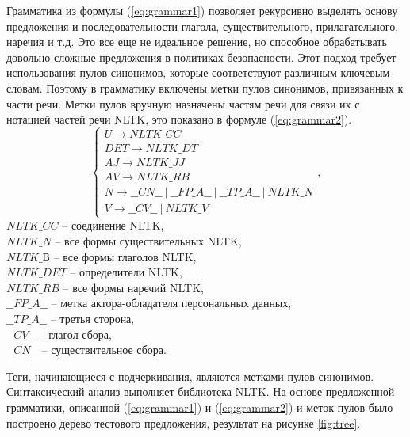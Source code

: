 \documentclass[../main]{subfiles}
\begin{document}
Грамматика из формулы (\ref{eq:grammar1}) позволяет рекурсивно выделять основу предложения и последовательности глагола, существительного, прилагательного, наречия и т.д. Это все еще не идеальное решение, но способное обрабатывать довольно сложные предложения в политиках безопасности. Этот подход требует использования пулов синонимов, которые соответствуют различным ключевым словам. Поэтому в грамматику включены метки пулов синонимов, привязанных к части речи. Метки пулов вручную назначены частям речи для связи их с нотацией частей речи NLTK, это показано в формуле (\ref{eq:grammar2}).
\begin{equation}
    \label{eq:grammar2}
    \left\{ 
        \begin{array}{l}
            U \rightarrow NLTK\_CC \\
            DET \rightarrow NLTK\_DT \\
            AJ \rightarrow NLTK\_JJ \\
            AV \rightarrow NLTK\_RB \\
            N \rightarrow \_\_CN\_\_\ |\ \_\_FP\_A\_\_\ |\ \_\_TP\_A\_\_\ |\ NLTK\_N \\
            V \rightarrow \_\_CV\_\_\ |\ NLTK\_V
        \end{array},
    \right. 
\end{equation}
$NLTK\_CC$ -- соединение NLTK,\\
\makebox[1.25cm]{}$NLTK\_N$ -- все формы существительных NLTK,\\
\makebox[1.25cm]{}$NLTK\_В$ -- все формы глаголов NLTK,\\
\makebox[1.25cm]{}$NLTK\_DET$ -- определители NLTK,\\
\makebox[1.25cm]{}$NLTK\_RB$ -- все формы наречий NLTK,\\
\makebox[1.25cm]{}$\_\_FP\_A\_\_$ -- метка актора-обладателя персональных данных,\\
\makebox[1.25cm]{}$\_\_TP\_A\_\_$ -- третья сторона,\\
\makebox[1.25cm]{}$\_\_CV\_\_$ -- глагол сбора,\\
\makebox[1.25cm]{}$\_\_CN\_\_$ -- существительное сбора.

Теги, начинающиеся с подчеркивания, являются метками пулов синонимов. Синтаксический анализ выполняет библиотека NLTK. На основе предложенной грамматики, описанной (\ref{eq:grammar1}) и (\ref{eq:grammar2}) и меток пулов было построено дерево тестового предложения, результат на рисунке \ref{fig:tree}.
\end{document}
